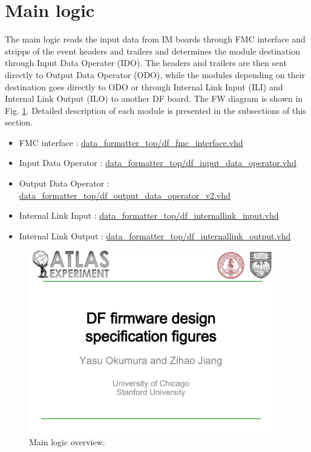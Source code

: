 \documentclass[11pt,letterpaper]{article}
\begin{document}

\section{Main logic}

The main logic reads the input data from IM boards through FMC interface and stripps of the event headers and trailers and determines the module destination through Input Data Operater (IDO). The headers and trailers are then sent directly to Output Data Operator (ODO), while the modules depending on their destination goes directly to ODO or through Internal Link Input (ILI) and Internal Link Output (ILO) to another DF board. The FW diagram is shown in Fig. \ref{fig:MAIN_LOGIC_OVERVIEW}. Detailed description of each module is presented in the subsections of this section. 

\begin{itemize}
\item FMC interface : \url{data_formatter_top/df_fmc_interface.vhd}
\item Input Data Operator : \url{data_formatter_top/df_input_data_operator.vhd}
\item Output Data Operator : \url{data_formatter_top/df_output_data_operator_v2.vhd}
\item Internal Link Input : \url{data_formatter_top/df_internallink_input.vhd}
\item Internal Link Output : \url{data_formatter_top/df_internallink_output.vhd}
\end{itemize}

\begin{figure}[h!]
  \centering
  \includegraphics[width=0.95\textwidth,clip,page=4]{figures.pdf}
  \caption{Main logic overview.}
  \label{fig:MAIN_LOGIC_OVERVIEW}
\end{figure}
\end{document}

